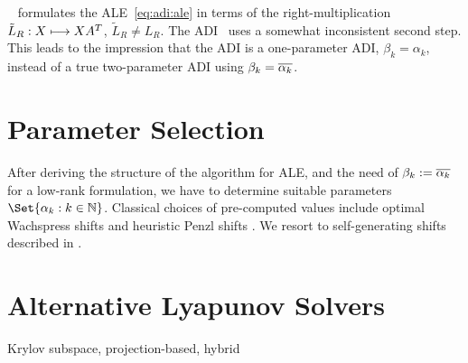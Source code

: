 \begin{remark}
  \citeauthor{Lang2017}~\cite{Lang2017} formulates the \ac{ALE}~\eqref{eq:adi:ale} in terms of the
  right-multiplication $\tilde L_R :X \longmapsto XA^T$, $\tilde L_R \neq L_R$.
  The ADI~\cite[Equation~(2.23)]{Lang2017} uses a somewhat inconsistent second step.
  This leads to the impression that the ADI is a one-parameter ADI, $\beta_k=\alpha_k$,
  instead of a true two-parameter ADI using $\beta_k = \conj{\alpha_k}$.
\end{remark}


\section{Parameter Selection}
\label{sec:adi:parameters}

After deriving the structure of the algorithm for \ac{ALE},
and the need of $\beta_k := \conj{\alpha_k}$ for a low-rank formulation,
we have to determine suitable parameters $\Set{\alpha_k : k\in\N}$.
Classical choices of pre-computed values include
optimal Wachspress shifts \cite{Wachspress1992,Wachspress2013} and
heuristic Penzl shifts \cite{Penzl1999}.
We resort to self-generating shifts described in \cite[Section~5.3]{Kuerschner2016}.

\section{Alternative Lyapunov Solvers}
Krylov subspace,
projection-based,
hybrid
